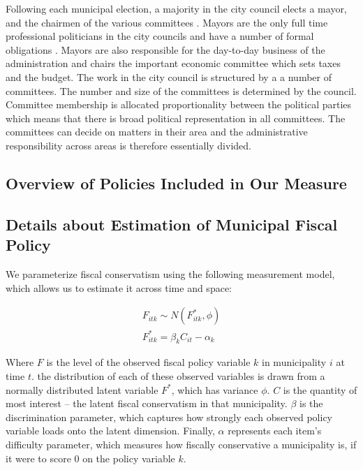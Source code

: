\documentclass[a4paper,12pt]{article}
\begin{document}
Following each municipal election, a majority in the city council elects a mayor, and the chairmen of the various committees \citep{serritzlew2008explaining}. Mayors are the only full time professional politicians in the city councils and have a number of formal obligations \citep{kjaer2015urban}. Mayors are also responsible for the day-to-day business of the administration and chairs the important economic committee which sets taxes and the budget. The work in the city council is structured by a a number of committees. The number and size of the committees is determined by the council. Committee membership is allocated proportionality between the political parties which means that there is broad political representation in all committees. The committees can decide on matters in their area and the administrative responsibility across areas is therefore essentially divided. 

\clearpage

\subsection{Overview of Policies Included in Our Measure} \label{policy}



\clearpage

\subsection{Details about Estimation of Municipal Fiscal Policy} \label{estimation}

We parameterize fiscal conservatism using the following measurement model, which allows us to estimate it across time and space:

\begin{gather*}
F_{itk} \sim N(F^*_{itk}, \phi)\\
F^*_{itk} = \beta_k C_{it} - \alpha_{k}
\end{gather*}

Where $F$ is the level of the observed fiscal policy variable $k$ in municipality $i$ at time $t$. the distribution of each of these observed variables is drawn from a normally distributed latent variable $F^*$, which has variance $\phi$. $C$ is the quantity of most interest -- the latent fiscal conservatism in that municipality. $\beta$ is the discrimination parameter, which captures how strongly each observed policy variable loads onto the latent dimension. Finally, $\alpha$ represents each item's difficulty parameter, which measures how fiscally conservative a municipality is, if it were to score 0 on the policy variable $k$.
\end{document}
